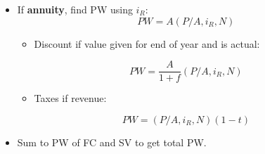 \begin{process}
\begin{enumerate}
\begin{itemize}
                \item If \textbf{annuity}, find PW using \( i_R \):
                \begin{equation}
                    PW = A \left(P/A, i_R, N \right)
                \end{equation}
                \begin{itemize}
                    \item Discount if value given for end of year and is actual:
                \end{itemize}
                \begin{equation}
                    PW = \frac{A}{1+f} \left(P/A, i_R, N \right)
                \end{equation}
                \begin{itemize}
                    \item Taxes if revenue:
                \end{itemize}
                \begin{equation}
                    PW = \left(P/A, i_R, N \right) (1-t)
                \end{equation}
                \item Sum to PW of FC and SV to get total PW.
            \end{itemize}
        \end{enumerate}
    \end{process}